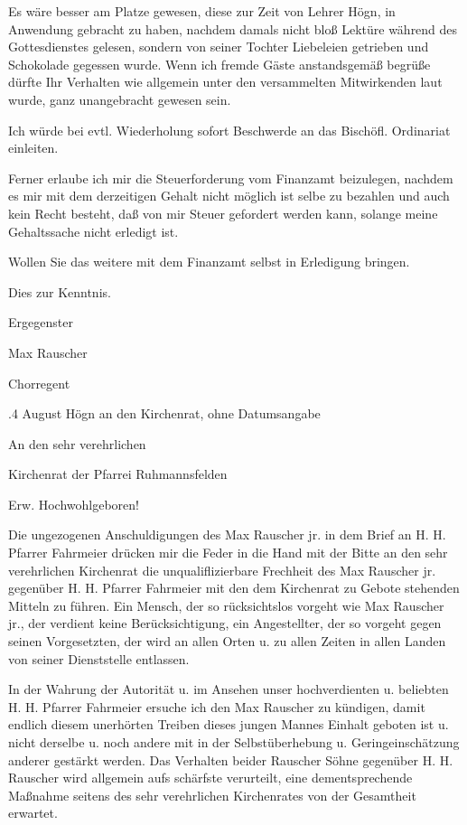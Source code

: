 Es wäre besser am Platze gewesen, diese zur Zeit von Lehrer Högn, in Anwendung
gebracht zu haben, nachdem damals nicht bloß Lektüre während des Gottesdienstes
gelesen, sondern von seiner Tochter Liebeleien getrieben und Schokolade gegessen
wurde. Wenn ich fremde Gäste anstandsgemäß begrüße dürfte Ihr Verhalten wie
allgemein unter den versammelten Mitwirkenden laut wurde, ganz unangebracht
gewesen sein.

Ich würde bei evtl. Wiederholung sofort Beschwerde an das Bischöfl. Ordinariat
einleiten.

Ferner erlaube ich mir die Steuerforderung vom Finanzamt beizulegen, nachdem es
mir mit dem derzeitigen Gehalt nicht möglich ist selbe zu bezahlen und auch kein
Recht besteht, daß von mir Steuer gefordert werden kann, solange meine
Gehaltssache nicht erledigt ist.

Wollen Sie das weitere mit dem Finanzamt selbst in Erledigung bringen.



Dies zur Kenntnis.



    Ergegenster



        Max Rauscher

            Chorregent

.4 August Högn an den Kirchenrat, ohne Datumsangabe



An den sehr verehrlichen

Kirchenrat der Pfarrei Ruhmannsfelden



Erw. Hochwohlgeboren!



Die ungezogenen Anschuldigungen des Max Rauscher jr. in dem Brief an H. H.
Pfarrer Fahrmeier drücken mir die Feder in die Hand mit der Bitte an den sehr
verehrlichen Kirchenrat die unqualiflizierbare Frechheit des Max Rauscher jr.
gegenüber H. H. Pfarrer Fahrmeier mit den dem Kirchenrat zu Gebote stehenden
Mitteln zu führen. Ein Mensch, der so rücksichtslos vorgeht wie Max Rauscher
jr., der verdient keine Berücksichtigung, ein Angestellter, der so vorgeht gegen
seinen Vorgesetzten, der wird an allen Orten u. zu allen Zeiten in allen Landen
von seiner Dienststelle entlassen.

In der Wahrung der Autorität u. im Ansehen unser hochverdienten u. beliebten H.
H. Pfarrer Fahrmeier ersuche ich den Max Rauscher zu kündigen, damit endlich
diesem unerhörten Treiben dieses jungen Mannes Einhalt geboten ist u. nicht
derselbe u. noch andere mit in der Selbstüberhebung u. Geringeinschätzung
anderer gestärkt werden. Das Verhalten beider Rauscher Söhne gegenüber H. H.
Rauscher wird allgemein aufs schärfste verurteilt, eine dementsprechende
Maßnahme seitens des sehr verehrlichen Kirchenrates von der Gesamtheit erwartet.



